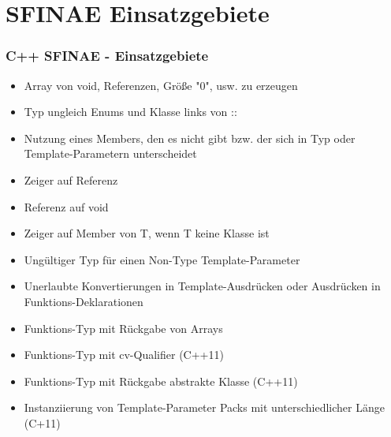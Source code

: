 \documentclass{beamer}
\begin{document}
\section{SFINAE Einsatzgebiete}
\begin{frame}[fragile]
\frametitle{C++ SFINAE - Einsatzgebiete}

\begin{itemize}
\item Array von void, Referenzen, Größe "0", usw. zu erzeugen
\item Typ ungleich Enums und Klasse links von ::
\item Nutzung eines Members, den es nicht gibt bzw. der sich in Typ oder Template-Parametern unterscheidet
\item Zeiger auf Referenz
\item Referenz auf void
\item Zeiger auf Member von T, wenn T keine Klasse ist
\item Ungültiger Typ für einen Non-Type Template-Parameter
\item Unerlaubte Konvertierungen in Template-Ausdrücken oder Ausdrücken in Funktions-Deklarationen
\item Funktions-Typ mit Rückgabe von Arrays
\item Funktions-Typ mit cv-Qualifier (C++11)
\item Funktions-Typ mit Rückgabe abstrakte Klasse (C++11)
\item Instanziierung von Template-Parameter Packs mit unterschiedlicher Länge (C+11)
\end{itemize}


\end{frame}
\end{document}
